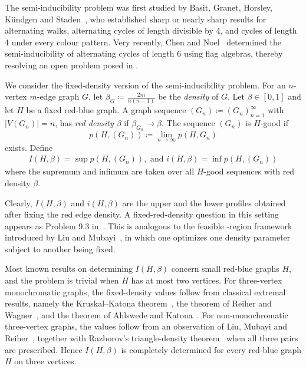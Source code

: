\documentclass[10pt,a4paper]{article}
\begin{document}
The semi-inducibility problem was first studied by  Basit, Granet, Horsley, K\"undgen and Staden~\cite{BGHKS}, who established sharp or nearly sharp results for alternating walks, alternating cycles of length divisible by 4, and cycles of length 4 under every colour pattern. Very recently, Chen and Noel~\cite{CN25} determined the semi-inducibility of alternating cycles of length 6 using flag algebras, thereby resolving an open problem posed in \cite{BGHKS}.












We consider the fixed-density version of the semi-inducibility problem. For an $n$-vertex $m$-edge graph $G$, let $\beta_G\coloneqq \frac{2m}{n(n-1)}$ be the \emph{density} of $G$.  Let $\beta\in[0,1]$ and let $H$ be a fixed red-blue graph. A graph sequence $(G_n)\coloneqq(G_n)_{n=1}^{\infty}$ with $|V(G_n)|=n$, has \emph{red density $\beta$} if $\beta_{G_n}\to\beta$. The sequence $(G_n)$ is $H$-good if
$$p(H,(G_n))\coloneqq \lim_{n\to\infty} p(H,G_n)$$
exists. Define 
\begin{align*}
    I(H,\beta)=\sup p(H,(G_n)), \text{ and } i(H,\beta)=\inf p(H,(G_n))
\end{align*}
where the supremum and infimum are taken over all $H$-good sequences with red density $\beta$.












Clearly, $ I(H,\beta)$ and $ i(H,\beta)$ are the upper and the lower profiles obtained after fixing the red edge density.  A fixed-red-density question in this setting appears as Problem 9.3 in~\cite{BGHKS}. This is analogous to the feasible -region framework introduced by Liu and Mubayi~\cite{LiuMubayiFeasible}, in which one optimizes one density parameter subject to another being fixed.


Most known results on determining $I(H,\beta)$ concern small red-blue graphs
$H$, and the problem is trivial when $H$ has at most two vertices. For
three-vertex monochromatic graphs, the fixed-density values follow from
classical extremal results, namely the Kruskal--Katona
theorem~\cite{Kruskal1963,Katona1968}, the theorem of Reiher and
Wagner~\cite{ReiherWagner}, and the theorem of Ahlswede and
Katona~\cite{AhlswedeKatona}. For non-monochromatic three-vertex graphs, the
values follow from an observation of Liu, Mubayi and Reiher~\cite{LiuMubayiReiher},
together with Razborov's triangle-density theorem~\cite{RazborovTriangle} when
all three pairs are prescribed. Hence $I(H,\beta)$ is completely determined
for every red-blue graph $H$ on three vertices.
\end{document}
